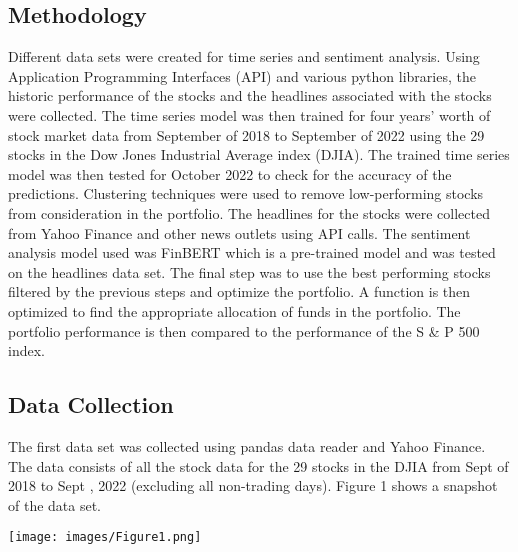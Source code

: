 \documentclass[12pt,a4paper, twoside]{article}
\begin{document}
\begin{multicols}{2}
\section{Methodology}
    \indent 
    Different data sets were created for time series and sentiment analysis. Using Application Programming Interfaces (API) and various python libraries, the historic performance of the stocks and the headlines associated with the stocks were collected. The time series model was then trained for four years’ worth of stock market data from September of 2018 to September of 2022 using the 29 stocks in the Dow Jones Industrial Average index (DJIA). The trained time series model was then tested for October 2022 to check for the accuracy of the predictions. Clustering techniques were used to remove low-performing stocks from consideration in the portfolio.
    \newline
    The headlines for the stocks were collected from Yahoo Finance and other news outlets using API calls. The sentiment analysis model used was FinBERT which is a pre-trained model and was tested on the headlines data set. The final step was to use the best performing stocks filtered by the previous steps and optimize the portfolio. A function is then optimized to find the appropriate allocation of funds in the portfolio. The portfolio performance is then compared to the performance of the S \& P 500 index.  

\subsection{Data Collection}
    The first data set was collected using pandas data reader and Yahoo Finance. The data consists of all the stock data for the 29 stocks in the DJIA from Sept  of 2018 to Sept , 2022 (excluding all non-trading days). Figure 1 shows a snapshot of the data set.
    \begin{center}
        \texttt{[image: images/Figure1.png]}
    \end{center}
    

\end{multicols}
\end{document}
